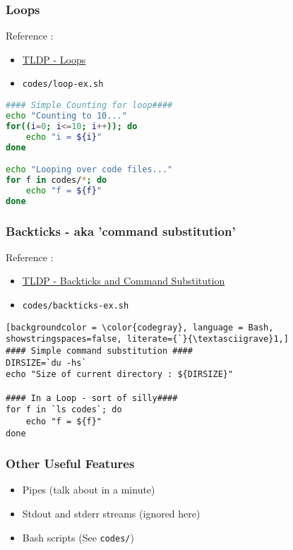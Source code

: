 \documentclass{beamer}
\newcommand{\code}[1]{\colorbox{codegray}{\texttt{#1}}}
\begin{document}
\begin{frame}[fragile]
\frametitle{Loops}
Reference :
\begin{itemize}
    \item \href{https://tldp.org/LDP/abs/html/loops1.html}{TLDP - Loops }
    \pause
    \item \code{codes/loop-ex.sh}
\end{itemize}
\begingroup
\scriptsize
\begin{lstlisting}[backgroundcolor = \color{codegray}, language = Bash, showstringspaces=false]
#### Simple Counting for loop####
echo "Counting to 10..."
for((i=0; i<=10; i++)); do
    echo "i = ${i}"
done

echo "Looping over code files..."
for f in codes/*; do
    echo "f = ${f}"
done
\end{lstlisting}
\endgroup
\end{frame}


\begin{frame}[fragile]
\frametitle{Backticks - aka 'command substitution'}
Reference :
\begin{itemize}
    \item \href{https://tldp.org/LDP/abs/html/commandsub.html}{TLDP - Backticks and Command Substitution}
    \pause
    \item \code{codes/backticks-ex.sh}
\end{itemize}
\begingroup
\scriptsize
\begin{lstlisting}[backgroundcolor = \color{codegray}, language = Bash, showstringspaces=false, literate={`}{\textasciigrave}1,]
#### Simple command substitution ####
DIRSIZE=`du -hs`
echo "Size of current directory : ${DIRSIZE}"

#### In a Loop - sort of silly####
for f in `ls codes`; do
    echo "f = ${f}"
done
\end{lstlisting}
\endgroup
\end{frame}





\begin{frame}
\frametitle{Other Useful Features}
\begin{itemize}
    \item Pipes (talk about in a minute)
    \pause
    \item Stdout and stderr streams (ignored here)
    \pause
    \item Bash scripts (See \code{codes/})
\end{itemize}
\end{frame}
\end{document}
